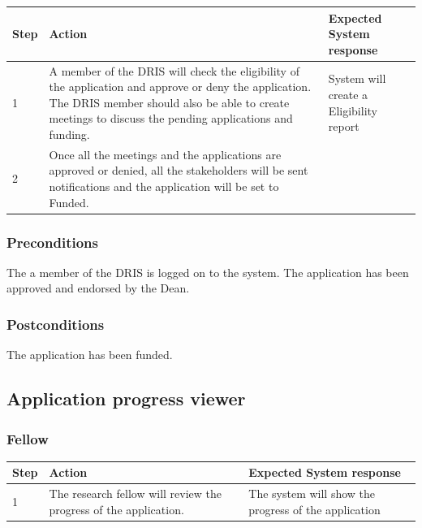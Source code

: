 \documentclass[12pt]{article}
\begin{document}
\begin{center}
\begin{tabular}{|l|p{6cm}|p{8cm}|}
\hline
Step & Action & Expected System response \\
\hline
1 & A member of the DRIS will check the eligibility of the application and approve or deny the application. The DRIS member should also be able to create meetings to discuss the pending applications and funding. &  System will create a Eligibility report \\
\hline
2 & Once all the meetings and the applications are approved or denied, all the stakeholders will be sent notifications and the application will be set to Funded. \\
\hline
\end{tabular}
\end{center}

\subsubsection*{Preconditions}
The a member of the DRIS is logged on to the system. The application has been approved and endorsed by the Dean.

\subsubsection*{Postconditions}
The application has been funded.

\subsection{Application progress viewer}
\subsubsection{Fellow}

\begin{center}
\begin{tabular}{|l|p{6cm}|p{8cm}|}
\hline
Step & Action & Expected System response \\
\hline
1 & The research fellow will review the progress of the application. & The system will show the progress of the application \\
\hline
\end{tabular}
\end{center}
\end{document}
